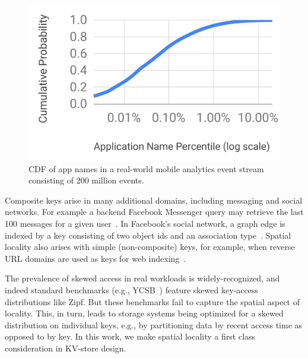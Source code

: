 

\begin{figure}[tb]
\centering
\includegraphics[width=0.7\columnwidth]{figs/cdf.pdf}
\caption{CDF of app names in a real-world mobile analytics event stream consisting of 200 million events.}
\label{fig:cdf}
\end{figure}

Composite keys arise in many additional domains, including messaging and social networks. 
For example a backend Facebook Messenger query may retrieve the last 100 messages for a 
given user~\cite{Borthakur:2011:AHG:1989323.1989438}. %
In Facebook's social network, a graph edge is indexed by a key consisting of two 
object ids and an association type~\cite{Armstrong:2013:LDB:2463676.2465296}.
Spatial locality   also arises with simple (non-composite) keys, for example, when 
reverse  URL domains are used as keys for web  indexing~\cite{Cho:1998:ECT:297805.297835}. 

The prevalence of skewed  access  in real workloads is widely-recognized, 
and indeed standard benchmarks (e.g., YCSB~\cite{YCSB})  feature skewed key-access distributions like Zipf.
But these benchmarks fail to capture the spatial aspect of locality.
This, in turn, leads to storage systems being optimized for a skewed distribution on individual keys, %
e.g., by partitioning data by recent access time as opposed to by key.
In this work, we make spatial locality a first class consideration in KV-store design.



